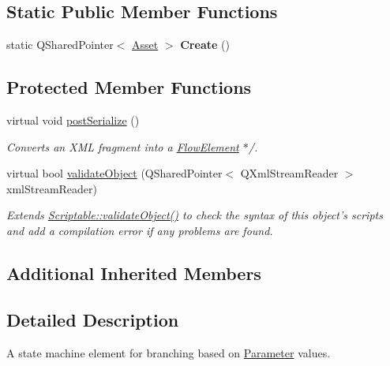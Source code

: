\subsection*{Static Public Member Functions}
\begin{DoxyCompactItemize}
\item 
\hypertarget{class_picto_1_1_flow_element_a91d314fc37bcdc5d69bebbc7b33b6b8f}{static Q\-Shared\-Pointer$<$ \hyperlink{class_picto_1_1_asset}{Asset} $>$ {\bfseries Create} ()}\label{class_picto_1_1_flow_element_a91d314fc37bcdc5d69bebbc7b33b6b8f}

\end{DoxyCompactItemize}
\subsection*{Protected Member Functions}
\begin{DoxyCompactItemize}
\item 
virtual void \hyperlink{class_picto_1_1_flow_element_afd4f429341aaf7a9898e493193b34bdc}{post\-Serialize} ()
\begin{DoxyCompactList}\small\item\em Converts an X\-M\-L fragment into a \hyperlink{class_picto_1_1_flow_element}{Flow\-Element} $\ast$/. \end{DoxyCompactList}\item 
\hypertarget{class_picto_1_1_flow_element_a45e730febc1c7b914956fed188fd7db5}{virtual bool \hyperlink{class_picto_1_1_flow_element_a45e730febc1c7b914956fed188fd7db5}{validate\-Object} (Q\-Shared\-Pointer$<$ Q\-Xml\-Stream\-Reader $>$ xml\-Stream\-Reader)}\label{class_picto_1_1_flow_element_a45e730febc1c7b914956fed188fd7db5}

\begin{DoxyCompactList}\small\item\em Extends \hyperlink{class_picto_1_1_scriptable_ab6e2944c43a3b5d418bf7b251594386d}{Scriptable\-::validate\-Object()} to check the syntax of this object's scripts and add a compilation error if any problems are found. \end{DoxyCompactList}\end{DoxyCompactItemize}
\subsection*{Additional Inherited Members}


\subsection{Detailed Description}
A state machine element for branching based on \hyperlink{class_picto_1_1_parameter}{Parameter} values. 

